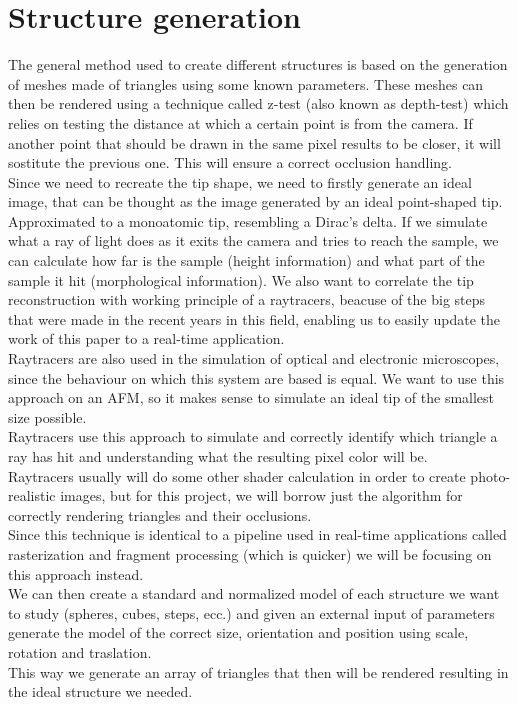 \documentclass{article}
\begin{document}
\section{Structure generation}\label{sec:Structure_generation}

The general method used to create different structures is based on the generation of meshes made of triangles using some known parameters. These meshes can then be rendered using a technique called z-test (also known as depth-test) which relies on testing the distance at which a certain point is from the camera. If another point that should be drawn in the same pixel results to be closer, it will sostitute the previous one. This will ensure a correct occlusion handling.
\\[.5cm]
Since we need to recreate the tip shape, we need to firstly generate an ideal image, that can be thought as the image generated by an ideal point-shaped tip. Approximated to a monoatomic tip, resembling a Dirac's delta. If we simulate what a ray of light does as it exits the camera and tries to reach the sample, we can calculate how far is the sample (height information) and what part of the sample it hit (morphological information). We also want to correlate the tip reconstruction with working principle of a raytracers, beacuse of the big steps that were made in the recent years in this field, enabling us to easily update the work of this paper to a real-time application.
\\[.5cm]
Raytracers are also used in the simulation of optical and electronic microscopes, since the behaviour on which this system are based is equal. We want to use this approach on an AFM, so it makes sense to simulate an ideal tip of the smallest size possible.
\\[.5cm]
Raytracers use this approach to simulate and correctly identify which triangle a ray has hit and understanding what the resulting pixel color will be. 
\\[.5cm]
Raytracers usually will do some other shader calculation in order to create photo-realistic images, but for this project, we will borrow just the algorithm for correctly rendering triangles and their occlusions.
\\[.5cm]
Since this technique is identical to a pipeline used in real-time applications called rasterization and fragment processing (which is quicker) we will be focusing on this approach instead.
\\[.5cm]
We can then create a standard and normalized model of each structure we want to study (spheres, cubes, steps, ecc.) and given an external input of parameters generate the model of the correct size, orientation and position using scale, rotation and traslation.
\\[.5cm]
This way we generate an array of triangles that then will be rendered resulting in the ideal structure we needed.
\end{document}
